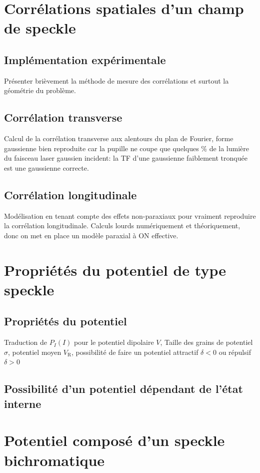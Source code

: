 \section{Corrélations spatiales d'un champ de speckle}
\subsection{Implémentation expérimentale}
Présenter brièvement la méthode de mesure des corrélations et surtout la géométrie du problème.

\subsection{Corrélation transverse}
Calcul de la corrélation transverse aux alentours du plan de Fourier, forme gaussienne bien reproduite car la pupille ne coupe que quelques \% de la lumière du faisceau laser gaussien incident: la TF d'une gaussienne faiblement tronquée est une gaussienne correcte.

\subsection{Corrélation longitudinale}
Modélisation en tenant compte des effets non-paraxiaux pour vraiment reproduire la corrélation longitudinale. Calculs lourds numériquement et théoriquement, donc on met en place un modèle paraxial à ON effective.

\section{Propriétés du potentiel de type speckle}
\subsection{Propriétés du potentiel}
Traduction de $P_I(I)$ pour le potentiel dipolaire $V$, Taille des grains de potentiel $\sigma$, potentiel moyen $V_{\mathrm{R}}$, possibilité de faire un potentiel attractif $\delta <0$ ou répulsif $\delta > 0$
\subsection{Possibilité d'un potentiel dépendant de l'état interne}

\section{Potentiel composé d'un speckle bichromatique}
